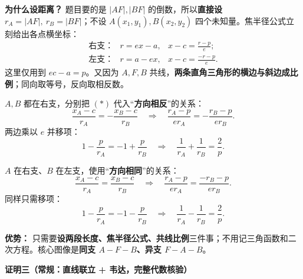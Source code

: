 \begin{proofbox}
  \textbf{为什么设距离？} 题目要的是 $|AF|,|BF|$ 的倒数，所以\textbf{直接设} $r_A=|AF|,\ r_B=|BF|$；不设 $A(x_1,y_1),B(x_2,y_2)$ 四个未知量。焦半径公式立刻给出各点横坐标：
  \[
    \begin{array}{lll}
      \text{右支：}& r=ex-a,&\displaystyle x-c=\frac{r-p}{e};\\[4pt]
      \text{左支：}& r=a-ex,&\displaystyle x-c=\frac{-r-p}{e}.
    \end{array}\tag{*}
  \]
  这里仅用到 $ec-a=p$。又因为 $A,F,B$ 共线，\textbf{两条直角三角形的横边与斜边成比例}；同向取等号，反向取相反数。
  \begin{description}[style=nextline,leftmargin=2.8em,labelsep=0.5em,itemsep=0.45em]
    \item[\textbf{同支（$A-F-B$）：}]
    $A,B$ 都在右支，分别把 $(*)$ 代入“\textbf{方向相反}”的关系：
    \[
      \frac{x_A-c}{r_A}=-\frac{x_B-c}{r_B}
      \quad\Longrightarrow\quad
      \frac{r_A-p}{e r_A}=-\frac{r_B-p}{e r_B}.
    \]
    两边乘以 $e$ 并移项：
    \[
      1-\frac p{r_A}=-1+\frac p{r_B}
      \quad\Longrightarrow\quad
      \boxed{\frac1{r_A}+\frac1{r_B}=\frac2p}.
    \]
    \item[\textbf{异支（$F-A-B$）：}]
    $A$ 在右支、$B$ 在左支，使用“\textbf{方向相同}”的关系：
    \[
      \frac{x_A-c}{r_A}=\frac{x_B-c}{r_B}
      \quad\Longrightarrow\quad
      \frac{r_A-p}{e r_A}=\frac{-r_B-p}{e r_B}.
    \]
    同样只需移项：
    \[
      1-\frac p{r_A}=-1-\frac p{r_B}
      \quad\Longrightarrow\quad
      \boxed{\frac1{r_A}-\frac1{r_B}=\frac2p}.
    \]
  \end{description}
  \textbf{优势：} 只需要\textbf{设两段长度、焦半径公式、共线比例}三件事；不用记三角函数和二次方程。核心图像是\textbf{同支 $A-F-B$、异支 $F-A-B$}。

  \medskip
\end{proofbox}\clearpage\begin{proofbox}
  \textbf{\textcolor{CProof}{证明三（常规：直线联立 + 韦达，完整代数核验）}}


\end{proofbox}
